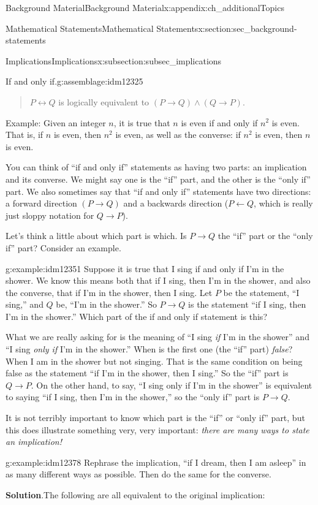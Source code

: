 \documentclass[oneside,10pt,]{book}
\numberwithin{equation}{chapter}
\def\iff{\leftrightarrow}
\def\imp{\rightarrow}
\begin{document}
\begin{appendixptx}{Background Material}{}{Background Material}{}{}{x:appendix:ch_additionalTopics}
\begin{sectionptx}{Mathematical Statements}{}{Mathematical Statements}{}{}{x:section:sec_background-statements}
\begin{subsectionptx}{Implications}{}{Implications}{}{}{x:subsection:subsec_implications}
\begin{assemblage}{If and only if.}{g:assemblage:idm12325}
\begin{quote}%
\(P \iff Q\) is logically equivalent to \((P \imp Q) \wedge (Q \imp P)\).%
\end{quote}
Example: Given an integer \(n\), it is true that \(n\) is even if and only if \(n^2\) is even. That is, if \(n\) is even, then \(n^2\) is even, as well as the converse: if \(n^2\) is even, then \(n\) is even.%
\end{assemblage}
You can think of ``if and only if'' statements as having two parts: an implication and its converse. We might say one is the ``if'' part, and the other is the ``only if'' part. We also sometimes say that ``if and only if'' statements have two directions: a forward direction \((P \imp Q)\) and a backwards direction (\(P \leftarrow Q\), which is really just sloppy notation for \(Q \imp P\)).%
\par
Let's think a little about which part is which. Is \(P \imp Q\) the ``if'' part or the ``only if'' part? Consider an example.%
\begin{example}{}{g:example:idm12351}%
Suppose it is true that I sing if and only if I'm in the shower. We know this means both that if I sing, then I'm in the shower, and also the converse, that if I'm in the shower, then I sing. Let \(P\) be the statement, ``I sing,'' and \(Q\) be, ``I'm in the shower.'' So \(P \imp Q\) is the statement ``if I sing, then I'm in the shower.'' Which part of the if and only if statement is this?%
\par
What we are really asking for is the meaning of ``I sing \emph{if} I'm in the shower'' and ``I sing \emph{only if} I'm in the shower.'' When is the first one (the ``if'' part) \emph{false}? When I am in the shower but not singing. That is the same condition on being false as the statement ``if I'm in the shower, then I sing.'' So the ``if'' part is \(Q \imp P\). On the other hand, to say, ``I sing only if I'm in the shower'' is equivalent to saying ``if I sing, then I'm in the shower,'' so the ``only if'' part is \(P \imp Q\).%
\end{example}
It is not terribly important to know which part is the ``if'' or ``only if'' part, but this does illustrate something very, very important: \emph{there are many ways to state an implication!}%
\begin{example}{}{g:example:idm12378}%
Rephrase the implication, ``if I dream, then I am asleep'' in as many different ways as possible. Then do the same for the converse.%
\par\smallskip%
\noindent\textbf{Solution}.\hypertarget{g:solution:idm12382}{}\quad{}The following are all equivalent to the original implication:%

\end{example}
\end{subsectionptx}
\end{sectionptx}
\end{appendixptx}
\end{document}
